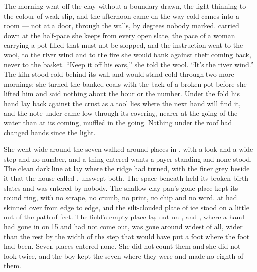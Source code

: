 The morning went off the clay without a boundary drawn, the light thinning to the colour of weak slip, and the afternoon came on the way cold comes into a room --- not at a door, through the walls, by degrees nobody marked.  carried  down at the half-pace she keeps from every open slate, the pace of a woman carrying a pot filled that must not be slopped, and the instruction went to the wool, to the river wind and to the fire she would bank against their coming back, never to the basket. “Keep it off his ears,” she told the wool. “It's the river wind.” The kiln stood cold behind its wall and would stand cold through two more mornings; she turned the banked coals with the back of a broken pot before she lifted him and said nothing about the hour or the number. Under the fold his hand lay back against the crust as a tool lies where the next hand will find it, and the note under  came low through its covering, nearer at the going of the water than at its coming, muffled in the going. Nothing under the roof had changed hands since the light.

She went wide around the seven walked-around places in , with a look and a wide step and no number, and a thing entered wants a payer standing and none stood. The clean dark line at  lay where the ridge had turned, with the finer grey beside it that the house called , unswept both. The space beneath  held its broken birth-slates and was entered by nobody. The shallow clay pan's gone place kept its round ring, with no scrape, no crumb, no print, no chip and no word.  at  had skinned over from edge to edge, and the silt-clouded plate of ice stood on  a little out of the path of feet. The field's empty place lay out on , and , where a hand had gone in on  15 and had not come out, was gone around widest of all, wider than the rest by the width of the step that would have put a foot where the foot had been. Seven places entered none. She did not count them and she did not look twice, and the boy kept the seven where they were and made no eighth of them.

